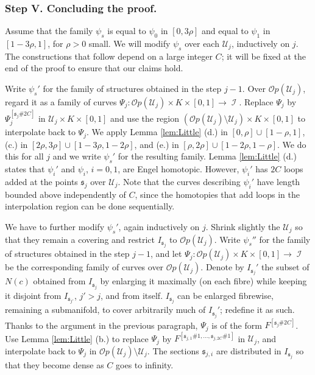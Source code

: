\documentclass[10pt]{amsart}
\newcommand{\s}{{\mathfrak{s}}}
\newcommand{\SU}{{\mathcal{U}}}
\newcommand{\Imm}{\operatorname{\mathcal{I}}}
\newcommand{\Op}{{\mathcal{O}p}}
\theoremstyle{definition}
\begin{document}
\subsubsection{Step V. Concluding the proof.}

Assume that the family $\psi_s$ is equal to $\psi_0$ in $[0,3\rho]$ and equal to $\psi_1$ in $[1-3\rho,1]$, for $\rho>0$ small. We will modify $\psi_s$ over each $\SU_j$, inductively on $j$. The constructions that follow depend on a large integer $C$; it will be fixed at the end of the proof to ensure that our claims hold.

Write $\psi_s'$ for the family of structures obtained in the step $j-1$. Over $\Op(\SU_j)$, regard it as a family of curves $\Psi_j: \Op(\SU_j) \times K \times [0,1] \to \Imm$. Replace $\Psi_j$ by $\Psi_j^{[\s_j\#2C]}$ in $\SU_j \times K \times [0,1]$ and use the region $(\Op(\SU_j) \setminus \SU_j) \times K \times [0,1]$ to interpolate back to $\Psi_j$. We apply Lemma \ref{lem:Little} (d.) in $[0,\rho] \cup [1-\rho,1]$, (c.) in $[2\rho,3\rho] \cup [1-3\rho, 1-2\rho]$, and (e.) in $[\rho,2\rho] \cup [1-2\rho, 1-\rho]$. We do this for all $j$ and we write $\psi_s'$ for the resulting family. Lemma \ref{lem:Little} (d.) states that $\psi_i'$ and $\psi_i$, $i=0,1$, are Engel homotopic. However, $\psi_i'$ has $2C$ loops added at the points $\s_j$ over $\SU_j$. Note that the curves describing $\psi_i'$ have length bounded above independently of $C$, since the homotopies that add loops in the interpolation region can be done sequentially.

We have to further modify $\psi_s'$, again inductively on $j$. Shrink slightly the $\SU_j$ so that they remain a covering and restrict $I_{\s_j}$ to $\Op(\SU_j)$. Write $\psi_s''$ for the family of structures obtained in the step $j-1$, and let $\Psi_j: \Op(\SU_j) \times K \times [0,1] \to \Imm$ be the corresponding family of curves over $\Op(\SU_j)$. Denote by $I_{\s_j}'$ the subset of $N(c)$ obtained from $I_{\s_j}$ by enlarging it maximally (on each fibre) while keeping it disjoint from $I_{\s_{j'}}$, $j'>j$, and from itself. $I_{\s_j}$ can be enlarged fibrewise, remaining a submanifold, to cover arbitrarily much of $I_{\s_j}'$; redefine it as such. Thanks to the argument in the previous paragraph, $\Psi_j$ is of the form $F^{[\s_j\#2C]}$. Use Lemma \ref{lem:Little} (b.) to replace $\Psi_j$ by $F^{[\s_{j,1}\#1,\dots,\s_{j,2C}\#1]}$ in $\SU_j$, and interpolate back to $\Psi_j$ in $\Op(\SU_j) \setminus \SU_j$. The sections $\s_{j,i}$ are distributed in $I_{\s_j}$ so that they become dense as $C$ goes to infinity.
\end{document}
